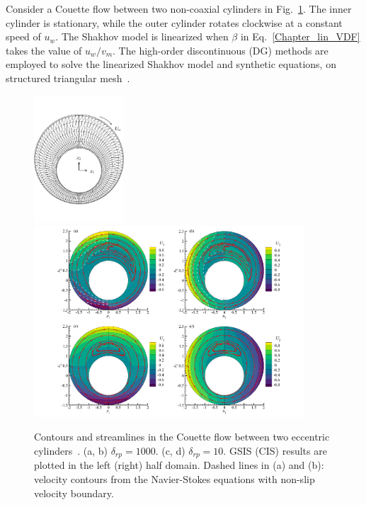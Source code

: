 Consider a Couette flow  between two non-coaxial cylinders in Fig.~\ref{TwoCylinderV}. The inner cylinder is stationary, while the outer cylinder rotates clockwise at a constant speed of $u_w$. The Shakhov model is linearized when $\beta$ in Eq.~\eqref{Chapter_lin_VDF} takes the value of $u_w/v_m$. The high-order discontinuous (DG)  methods are employed to solve the linearized Shakhov model and synthetic equations, on structured triangular mesh~\cite{SuArXiv2019}.  



\begin{figure}[tp]
	\centering
	\includegraphics[width=0.3\textwidth]{GSIS/IMG/Cylinder_G.pdf}\\
	\vskip 0.5cm
	\includegraphics[width=0.9\textwidth]{GSIS/IMG/TwoCylinder.pdf}
	\caption{Contours and streamlines in the Couette flow between two eccentric cylinders~\cite{SuArXiv2019}. (a, b)  $\delta_{rp}=1000$. (c, d) $\delta_{rp}=10$. GSIS (CIS) results are plotted in the left (right) half domain. Dashed lines in (a) and (b):  velocity contours from the Navier-Stokes equations with non-slip velocity boundary.
	}
	\label{TwoCylinderV}
\end{figure}



